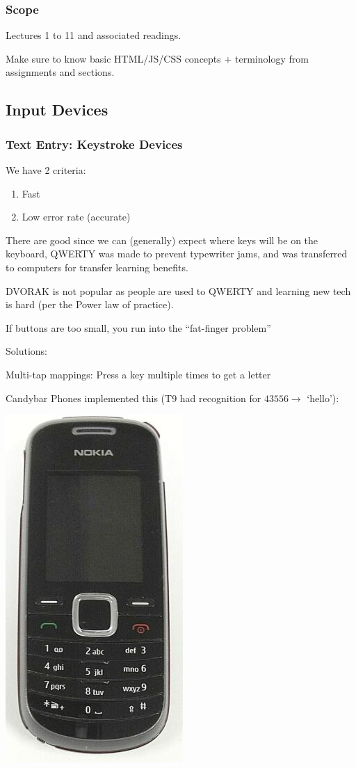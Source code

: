 \subsubsection{Scope}
Lectures 1 to 11 and associated readings.

Make sure to know basic HTML/JS/CSS concepts + terminology from assignments and sections.

\subsection{Input Devices}
\subsubsection{Text Entry: Keystroke Devices}
We have 2 criteria:
\begin{enumerate}
    \item Fast
    \item Low error rate (accurate)
\end{enumerate}

There are good since we can (generally) expect where keys will be on the keyboard,
QWERTY was made to prevent typewriter jams, and was transferred to computers for transfer learning benefits.

DVORAK is not popular as people are used to QWERTY and learning new tech is hard (per the Power law of practice).

If buttons are too small, you run into the ``fat-finger problem''

Solutions:
\begin{shaded}
Multi-tap mappings: Press a key multiple times to get a letter

Candybar Phones implemented this (T9 had recognition for $43556\to$ `hello'):
\begin{center}
    \includegraphics[scale=0.5]{lectures/wk5/img/candybar.jpg}
\end{center}
\end{shaded}

